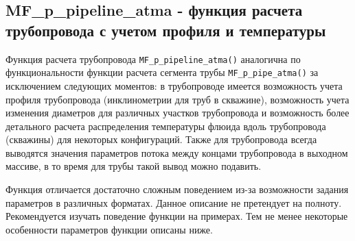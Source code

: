 \subsection{MF\_p\_pipeline\_atma - функция расчета трубопровода с учетом профиля и температуры}

Функция расчета трубопровода \texttt{MF_p_pipeline_atma()} аналогична по функциональности функции расчета сегмента трубы \texttt{MF_p_pipe_atma()} за исключением следующих моментов: в трубопроводе имеется возможность учета профиля трубопровода (инклинометрии для труб в скважине), возможность учета изменения диаметров для различных участков трубопровода и возможность более детального расчета распределения температуры флюида вдоль трубопровода (скважины) для некоторых конфигураций. Также для трубопровода всегда выводятся значения параметров потока между концами трубопровода в выходном массиве, в то время для трубы такой вывод можно подавить.

Функция отличается достаточно сложным поведением из-за возможности задания параметров в различных форматах. Данное описание не претендует на полноту. Рекомендуется изучать поведение функции на примерах. Тем не менее некоторые особенности параметров функции описаны ниже.

